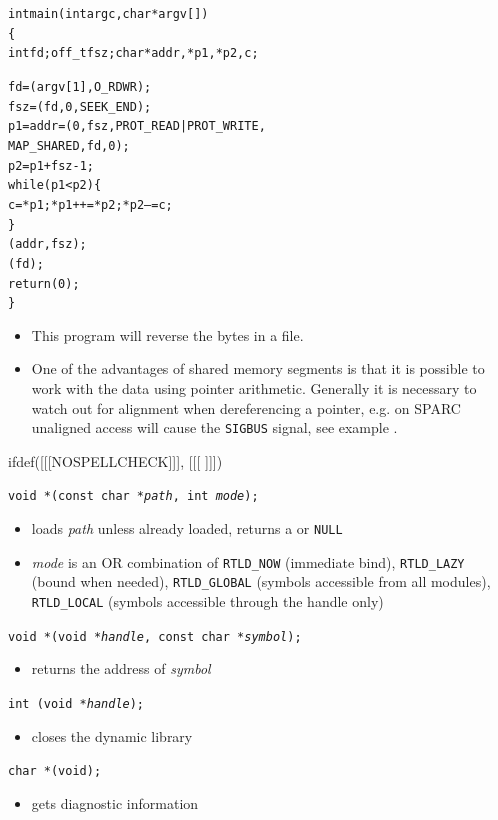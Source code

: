 
\begin{slide}
\setlength{\baselineskip}{0.8\baselineskip}
\begin{alltt}
int main(int argc, char *argv[])
\{
    int fd; off\_t fsz; char *addr, *p1, *p2, c;

    fd = (argv[1], O\_RDWR);
    fsz = (fd, 0, SEEK\_END);
    p1 = addr = (0, fsz, PROT\_READ | PROT\_WRITE,
        MAP\_SHARED, fd, 0);
    p2 = p1 + fsz - 1;
    while (p1 < p2) \{
            c = *p1; *p1++ = *p2; *p2-- = c;
    \}
    (addr, fsz);
    (fd);
    return (0);
\}
\end{alltt}
\end{slide}

\begin{itemize}
\item This program will reverse the bytes in a file.
\item One of the advantages of shared memory segments is that it is possible
to work with the data using pointer arithmetic. Generally it is necessary
to watch out for alignment when dereferencing a pointer, e.g. on SPARC
unaligned access will cause the \texttt{SIGBUS} signal, see example
.
\end{itemize}


ifdef([[[NOSPELLCHECK]]], [[[
]]])

\begin{slide}
\texttt{void *(const char *\emph{path}, int \emph{mode});}
\begin{itemize}
\item loads \emph{path} unless already loaded, returns
a  or \texttt{NULL}
\item \emph{mode} is an OR combination of \texttt{RTLD\_NOW} (immediate
bind), \texttt{RTLD\_LAZY} (bound when needed), \texttt{RTLD\_GLOBAL}
(symbols accessible from all modules), \texttt{RTLD\_LOCAL} (symbols accessible
through the handle only)
\end{itemize}
\texttt{void *(void *\emph{handle}, const char *\emph{symbol});}
\begin{itemize}
\item returns the address of \emph{symbol}
\end{itemize}
\texttt{int (void *\emph{handle});}
\begin{itemize}
\item closes the dynamic library
\end{itemize}
\texttt{char *(void);}
\begin{itemize}
\item gets diagnostic information
\end{itemize}
\end{slide}

